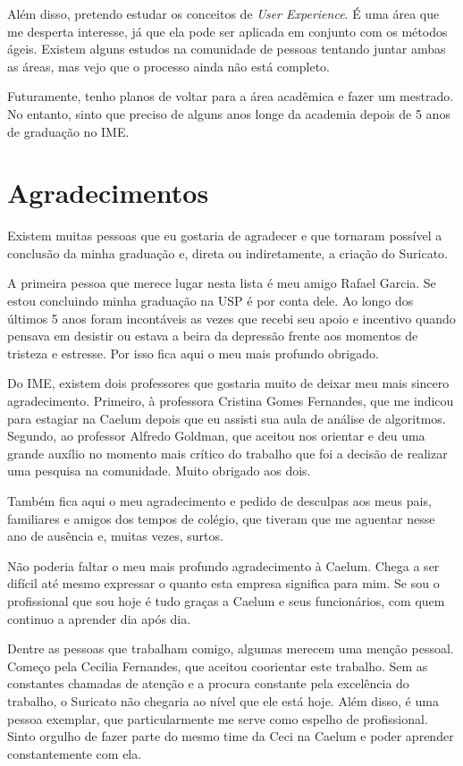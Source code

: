 \documentclass[titlepage,a4paper]{article}
\newcommand{\suricato}{Suricato}
\begin{document}
Além disso, pretendo estudar os conceitos de \textit{User Experience}. É uma área que me desperta interesse, já que ela pode ser aplicada em conjunto com os métodos ágeis. Existem alguns estudos na comunidade de pessoas tentando juntar ambas as áreas, mas vejo que o processo ainda não está completo.

Futuramente, tenho planos de voltar para a área acadêmica e fazer um mestrado. No entanto, sinto que preciso de alguns anos longe da academia depois de 5 anos de graduação no IME.

\section{Agradecimentos}

Existem muitas pessoas que eu gostaria de agradecer e que tornaram possível a conclusão da minha graduação e, direta ou indiretamente, a criação do \suricato{}.

A primeira pessoa que merece lugar nesta lista é meu amigo Rafael Garcia. Se estou concluindo minha graduação na USP é por conta dele. Ao longo dos últimos 5 anos foram incontáveis as vezes que recebi seu apoio e incentivo quando pensava em desistir ou estava a beira da depressão frente aos momentos de tristeza e estresse. Por isso fica aqui o meu mais profundo obrigado.

Do IME, existem dois professores que gostaria muito de deixar meu mais sincero agradecimento. Primeiro, à professora Cristina Gomes Fernandes, que me indicou para estagiar na Caelum depois que eu assisti sua aula de análise de algoritmos. Segundo, ao professor Alfredo Goldman, que aceitou nos orientar e deu uma grande auxílio no momento mais crítico do trabalho que foi a decisão de realizar uma pesquisa na comunidade. Muito obrigado aos dois.

Também fica aqui o meu agradecimento e pedido de desculpas aos meus pais, familiares e amigos dos tempos de colégio, que tiveram que me aguentar nesse ano de ausência e, muitas vezes, surtos. 

Não poderia faltar o meu mais profundo agradecimento à Caelum. Chega a ser difícil até mesmo expressar o quanto esta empresa significa para mim. Se sou o profissional que sou hoje é tudo graças a Caelum e seus funcionários, com quem continuo a aprender dia após dia. 

Dentre as pessoas que trabalham comigo, algumas merecem uma menção pessoal. Começo pela Cecilia Fernandes, que aceitou coorientar este trabalho. Sem as constantes chamadas de atenção e a procura constante pela excelência do trabalho, o \suricato{} não chegaria ao nível que ele está hoje. Além disso, é uma pessoa exemplar, que particularmente me serve como espelho de profissional. Sinto orgulho de fazer parte do mesmo time da Ceci na Caelum e poder aprender constantemente com ela.
\end{document}
